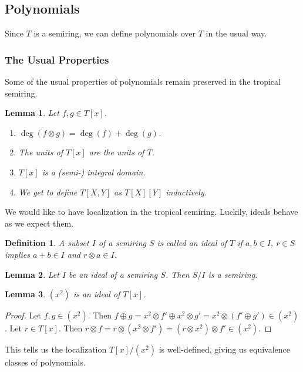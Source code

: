 \documentclass{article}
\newtheorem{lemma}{Lemma}
\newtheorem{definition}{Definition}
\begin{document}
\subsection{Polynomials}
Since $T$ is a semiring, we can define polynomials over $T$ in the usual way.

\subsubsection{The Usual Properties}
Some of the usual properties of polynomials remain preserved in the tropical semiring.
\begin{lemma}
	Let $f, g \in T[x]$.
	\begin{enumerate}
		\item $\deg(f \otimes g) = \deg(f) + \deg(g)$.
		\item The units of $T[x]$ are the units of $T$.
		\item $T[x]$ is a (semi-) integral domain.
		\item We get to define $T[X, Y]$ as $T[X][Y]$ inductively.
	\end{enumerate}
\end{lemma}

We would like to have localization in the tropical semiring. Luckily, ideals behave as we expect them.

\begin{definition}
	A subset $I$ of a semiring $S$ is called an \emph{ideal} of $T$ if $a, b \in I$, $r \in S$ implies $a + b \in I$ and $r \otimes a \in I$.
\end{definition}
\begin{lemma}
	Let $I$ be an ideal of a semiring $S$.
	Then $S/I$ is a semiring.
\end{lemma}

\begin{lemma}
	$(x^2)$ is an ideal of $T[x]$.
\end{lemma}
\begin{proof}
	Let $f, g \in (x^2)$.
	Then $f \oplus g = x^2 \otimes f' \oplus x^2 \otimes g' = x^2 \otimes (f' \oplus g') \in (x^2)$.
	Let $r \in T[x]$.
	Then $r \otimes f = r \otimes (x^2 \otimes f') = (r \otimes x^2) \otimes f' \in (x^2)$.
\end{proof}

This tells us the localization $T[x] / (x^2)$ is well-defined, giving us equivalence classes of polynomials.
\end{document}
